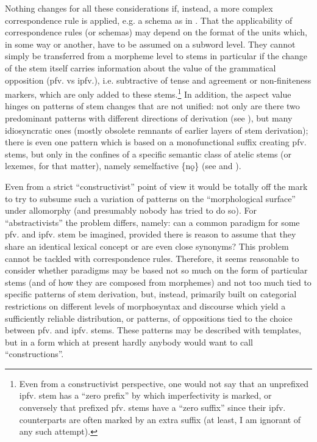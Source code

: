 \documentclass[output=paper]{langscibook}
\begin{document}
Nothing changes for all these considerations if, instead, a more complex correspondence rule is applied, e.g. a schema as in . That the applicability of correspondence rules (or schemas) may depend on the format of the units which, in some way or another, have to be assumed on a subword level. They cannot simply be transferred from a morpheme level to stems in particular if the change of the stem itself carries information about the value of the grammatical opposition (pfv. vs ipfv.), i.e. subtractive of tense and agreement or non-finiteness markers, which are only added to these stems.\footnote{Even from a constructivist perspective, one would not say that an unprefixed ipfv. stem has a “zero prefix” by which imperfectivity is marked, or conversely that prefixed pfv. stems have a “zero suffix” since their ipfv. counterparts are often marked by an extra suffix (at least, I am ignorant of any such attempt).} In addition, the aspect value hinges on patterns of stem changes that are not unified: not only are there two predominant patterns with different directions of derivation (see ), but many idiosyncratic ones (mostly obsolete remnants of earlier layers of stem derivation); there is even one pattern which is based on a monofunctional suffix creating pfv. stems, but only in the confines of a specific semantic class of atelic stems (or lexemes, for that matter), namely semelfactive \{nǫ\} (see  and ).

Even from a strict ``constructivist'' point of view it would be totally off the mark to try to subsume such a variation of patterns on the “morphological surface” under allomorphy (and presumably nobody has tried to do so). For ``abstractivists'' the problem differs, namely: can a common paradigm for some pfv. and ipfv. stem be imagined, provided there is reason to assume that they share an identical lexical concept or are even close synonyms? This problem cannot be tackled with correspondence rules. Therefore, it seems reasonable to consider whether paradigms may be based not so much on the form of particular stems (and of how they are composed from morphemes) and not too much tied to specific patterns of stem derivation, but, instead, primarily built on categorial restrictions on different levels of morphosyntax and discourse which yield a sufficiently reliable distribution, or patterns, of oppositions tied to the choice between pfv. and ipfv. stems. These patterns may be described with templates, but in a form which at present hardly anybody would want to call ``constructions''.
\end{document}
